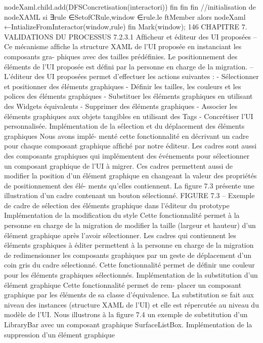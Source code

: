 \documentclass{article}
\begin{document}
nodeXaml.child.add(DFSConcretisation(interactori))
ﬁn
ﬁn
ﬁn
//initialisation de nodeXAML
si ∃rule ∈SetofCRule,window ∈rule.le ftMember alors
nodeXaml ←IntializeFromInteractor(window,rule)
ﬁn
Mark(window);
146
CHAPITRE 7. VALIDATIONS DU PROCESSUS
7.2.3.1
Afﬁcheur et éditeur des UI proposées
– Ce mécanisme afﬁche la structure XAML de l’UI proposée en instanciant les composants gra-
phiques avec des tailles prédéﬁnies. Le positionnement des éléments de l’UI proposée est déﬁni
par la personne en charge de la migration.
– L’éditeur des UI proposées permet d’effectuer les actions suivantes :
- Sélectionner et positionner des éléments graphiques
- Déﬁnir les tailles, les couleurs et les polices des éléments graphiques
- Substituer les éléments graphiques en utilisant des Widgets équivalents
- Supprimer des éléments graphiques
- Associer les éléments graphiques aux objets tangibles en utilisant des Tags
- Concrétiser l’UI personnalisée.
Implémentation de la sélection et du déplacement des éléments graphiques
Nous avons implé-
menté cette fonctionnalité en décrivant un cadre pour chaque composant graphique afﬁché par notre
éditeur. Les cadres sont aussi des composants graphiques qui implémentent des événements pour
sélectionner un composant graphique de l’UI à migrer. Ces cadres permettent aussi de modiﬁer la
position d’un élément graphique en changeant la valeur des propriétés de positionnement des élé-
ments qu’elles contiennent. La ﬁgure 7.3 présente une illustration d’un cadre contenant un bouton
sélectionné.
FIGURE 7.3 – Exemple de cadre de sélection des éléments graphique dans l’éditeur du prototype
Implémentation de la modiﬁcation du style
Cette fonctionnalité permet à la personne en charge de
la migration de modiﬁer la taille (largeur et hauteur) d’un élément graphique après l’avoir sélectionner.
Les cadres qui contiennent les éléments graphiques à éditer permettent à la personne en charge de la
migration de redimensionner les composants graphiques par un geste de déplacement d’un coin gris
du cadre sélectionné. Cette fonctionnalité permet de déﬁnir une couleur pour les éléments graphiques
sélectionnés.
Implémentation de la substitution d’un élément graphique
Cette fonctionnalité permet de rem-
placer un composant graphique par les éléments de sa classe d’équivalence. La substitution se fait
aux niveau des instances (structure XAML de l’UI) et elle est répercutée au niveau du modèle de
l’UI. Nous illustrons à la ﬁgure 7.4 un exemple de substitution d’un LibraryBar avec un composant
graphique SurfaceListBox.
Implémentation de la suppression d’un élément graphique
\end{document}
